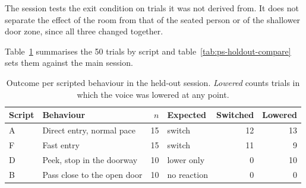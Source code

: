 The session tests the exit condition on trials it was not derived from. It
does not separate the effect of the room from that of the seated person or of
the shallower door zone, since all three changed together.


Table~\ref{tab:ps-holdout-outcomes} summarises the 50 trials by script and
table~\ref{tab:ps-holdout-compare} sets them against the main session.

\begin{table}[htb]
  \centering
  \caption{Outcome per scripted behaviour in the held-out session.
  \emph{Lowered} counts trials in which the voice was lowered at any point.}
  \label{tab:ps-holdout-outcomes}
  \begin{tabular}{llrlrr}
    \toprule
    Script & Behaviour & $n$ & Expected & Switched & Lowered \\
    \midrule
    A & Direct entry, normal pace   & 15 & switch      & 12 & 13 \\
    F & Fast entry                  & 15 & switch      & 11 &  9 \\
    D & Peek, stop in the doorway   & 10 & lower only  &  0 & 10 \\
    B & Pass close to the open door & 10 & no reaction &  0 &  0 \\
    \bottomrule
  \end{tabular}
\end{table}

